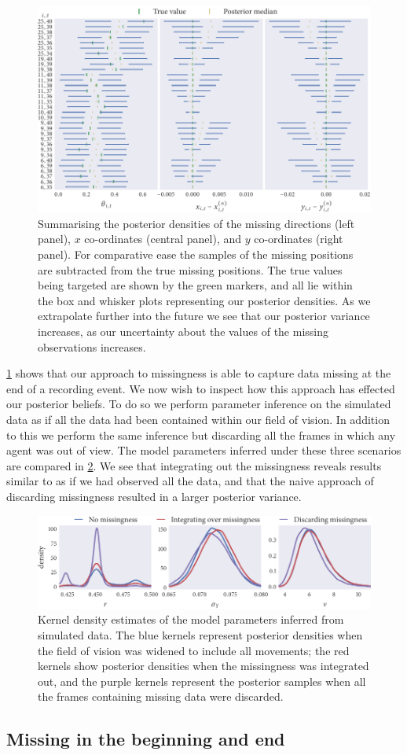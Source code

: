 \begin{figure}[tbp]
  \includegraphics{end/summary.pdf}
  \caption{Summarising the posterior densities of the missing directions (left
  panel), $x$ co-ordinates (central panel), and $y$ co-ordinates (right
  panel). For comparative ease the samples of the missing positions are
  subtracted from the true missing positions. The true values being
  targeted are shown by the green markers, and all lie within the box and
  whisker plots representing our posterior densities. As we extrapolate further
  into the future we see that our posterior variance increases, as our
  uncertainty about the values of the missing observations increases.}
  \label{fig:end_summary}
\end{figure}

\cref{fig:end_summary} shows that our approach to missingness is able to
capture data missing at the end of a recording event. We now wish to inspect
how this approach has effected our posterior beliefs. To do so we perform
parameter inference on the simulated data as if all the data had been contained
within our field of vision. In addition to this we perform the same inference
but discarding all the frames in which any agent was out of view. The model
parameters inferred under these three scenarios are compared in
\cref{fig:end_compare}. We see that integrating out the missingness reveals
results similar to as if we had observed all the data, and that the naive
approach of discarding missingness resulted in a larger posterior variance.

\begin{figure}
  \includegraphics{end/compare_params.pdf}
  \caption{Kernel density estimates of the model parameters inferred from
  simulated data. The blue kernels represent posterior densities when the
  field of vision was widened to include all movements; the red kernels
  show posterior densities when the missingness was integrated out, and the
  purple kernels represent the posterior samples when all the frames
  containing missing data were discarded.}
  \label{fig:end_compare}
\end{figure}

\subsection{Missing in the beginning and end}

